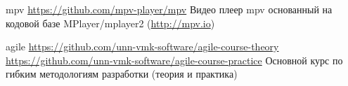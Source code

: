 \documentclass[12pt,a4paper]{moderncv}
\begin{document}
\cvline
  {mpv}
  {\url{https://github.com/mpv-player/mpv}\newline{}
  Видео плеер mpv основанный на кодовой базе MPlayer/mplayer2 \newline (\url{http://mpv.io})}

\cvline
  {agile}
  {
  \url{https://github.com/unn-vmk-software/agile-course-theory}\newline{}
  \url{https://github.com/unn-vmk-software/agile-course-practice}\newline{}
  Основной курс по гибким методологиям разработки (теория и практика)
  }
\end{document}
